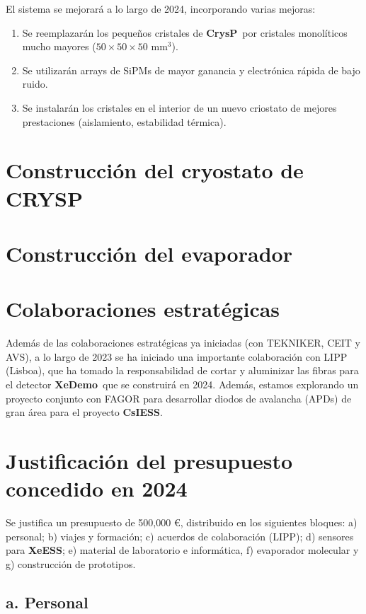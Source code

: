 \documentclass[12pt,a4paper,article]{report} %
\def\xess{{\bf XeESS}}
\def\cess{{\bf CsIESS}}
\def\xed{{\bf XeDemo}}
\def\crysp{{\bf CrysP}}
\begin{document}
El sistema se mejorará a lo largo de 2024, incorporando varias mejoras:

\begin{enumerate}
\item Se reemplazarán los pequeños cristales de \crysp\ por cristales monolíticos mucho mayores ($50 \times 50 \times 50$ mm$^3$). 
\item Se utilizarán arrays de SiPMs de mayor ganancia y electrónica rápida de bajo ruido.  
\item Se instalarán los cristales en el interior de un nuevo criostato de mejores prestaciones (aislamiento, estabilidad térmica). 
\end{enumerate}

\section*{Construcción del cryostato de CRYSP}

\section*{Construcción del evaporador}




\section*{Colaboraciones estratégicas}

Además de las colaboraciones estratégicas ya iniciadas (con TEKNIKER, CEIT y AVS), a lo largo de 2023 se ha iniciado una importante colaboración con LIPP (Lisboa), que ha tomado la responsabilidad de cortar y aluminizar las fibras para el detector \xed\ que se construirá en 2024. Además, estamos explorando un proyecto conjunto con FAGOR para  
desarrollar diodos de avalancha (APDs) de gran área para el proyecto \cess.  
 

\section*{Justificación del presupuesto concedido en 2024}

Se justifica un presupuesto de 500,000 \euro, distribuido en los siguientes bloques: a) personal; b) viajes y formación; c) acuerdos de colaboración (LIPP);  d) sensores para \xess; e) material de laboratorio e informática, f) evaporador molecular y g) construcción de prototipos. 

 \subsection*{a. Personal}
 
\end{document}

